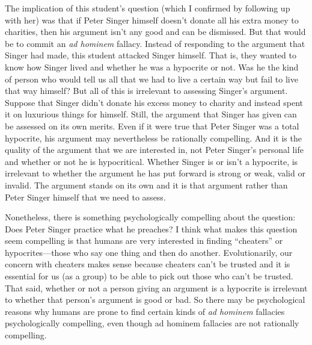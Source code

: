The implication of this student's question (which I confirmed by following up with her) was that if Peter Singer himself doesn't donate all his extra money to charities, then his argument isn't any good and can be dismissed. But that would be to commit an \textit{ad hominem} fallacy. Instead of responding to the argument that Singer had made, this student attacked Singer himself. That is, they wanted to know how Singer lived and whether he was a hypocrite or not. Was he the kind of person who would tell us all that we had to live a certain way but fail to live that way himself? But all of this is irrelevant to assessing Singer's argument. Suppose that Singer didn't donate his excess money to charity and instead spent it on luxurious things for himself. Still, the argument that Singer has given can be assessed on its own merits. Even if it were true that Peter Singer was a total hypocrite, his argument may nevertheless be rationally compelling. And it is the quality of the argument that we are interested in, not Peter Singer's personal life and whether or not he is hypocritical. Whether Singer is or isn't a hypocrite, is irrelevant to whether the argument he has put forward is strong or weak, valid or invalid. The argument stands on its own and it is that argument rather than Peter Singer himself that we need to assess.

Nonetheless, there is something psychologically compelling about the question: Does Peter Singer practice what he preaches? I think what makes this question seem compelling is that humans are very interested in finding ``cheaters'' or hypocrites---those who say one thing and then do another. Evolutionarily, our concern with cheaters makes sense because cheaters can't be trusted and it is essential for us (as a group) to be able to pick out those who can't be trusted. That said, whether or not a person giving an argument is a hypocrite is irrelevant to whether that person's argument is good or bad. So there may be psychological reasons why humans are prone to find certain kinds of \textit{ad hominem} fallacies psychologically compelling, even though ad hominem fallacies are not rationally compelling.

